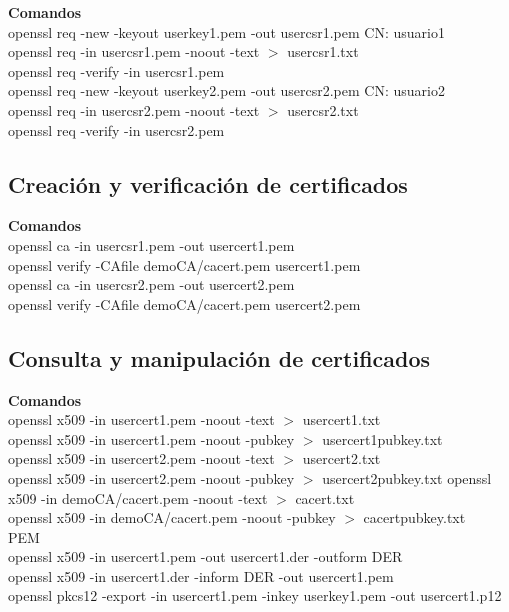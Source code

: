 \documentclass[11pt]{article}
\begin{document}
      \par
      \textbf{Comandos}\\
      openssl req -new -keyout userkey1.pem -out usercsr1.pem \hspace{10mm}CN: usuario1\\
      openssl req -in usercsr1.pem -noout -text $>$  usercsr1.txt\\
      openssl req -verify -in usercsr1.pem\\
      openssl req -new -keyout userkey2.pem -out usercsr2.pem \hspace{10mm}CN: usuario2\\
      openssl req -in usercsr2.pem -noout -text $>$  usercsr2.txt\\
      openssl req -verify -in usercsr2.pem

    \subsection{Creación y verificación de certificados}
      \par
      \textbf{Comandos}\\
      openssl ca -in usercsr1.pem -out usercert1.pem\\
      openssl verify -CAfile demoCA/cacert.pem usercert1.pem\\
      openssl ca -in usercsr2.pem -out usercert2.pem\\
      openssl verify -CAfile demoCA/cacert.pem usercert2.pem

    \subsection{Consulta y manipulación de certificados}
      \par
      \textbf{Comandos}\\
      openssl x509 -in usercert1.pem -noout -text $>$ usercert1.txt\\
      openssl x509 -in usercert1.pem -noout -pubkey $>$ usercert1pubkey.txt\\
      openssl x509 -in usercert2.pem -noout -text $>$ usercert2.txt\\
      openssl x509 -in usercert2.pem -noout -pubkey $>$ usercert2pubkey.txt
      openssl x509 -in demoCA/cacert.pem -noout -text $>$ cacert.txt\\
      openssl x509 -in demoCA/cacert.pem -noout -pubkey $>$ cacertpubkey.txt\\
      PEM\\
      openssl x509 -in usercert1.pem -out usercert1.der -outform DER\\
      openssl x509 -in usercert1.der -inform DER -out usercert1.pem\\
      openssl pkcs12 -export -in usercert1.pem -inkey userkey1.pem -out usercert1.p12
\end{document}
